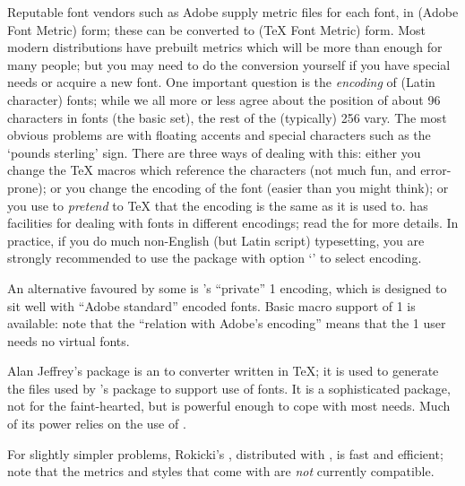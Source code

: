 Reputable font vendors such as Adobe supply metric files for each
font, in  (Adobe Font Metric) form; these can be converted
to  (\TeX{} Font Metric) form. Most modern distributions have
prebuilt metrics which will be more than enough for many people; but you may
need to do the conversion yourself if you have special needs or
acquire a new font. One important question is the \emph{encoding} of
(Latin character) fonts; while we all more or less agree about the
position of about 96 characters in fonts (the basic  set), the
rest of the (typically) 256 vary. The most obvious problems are with
floating accents and special characters such as the `pounds sterling'
sign. There are three ways of dealing with this: either you change the
\TeX{} macros which reference the characters (not much fun, and
error-prone); or you change the encoding of the font (easier than you
might think); or you use  to
\emph{pretend} to \TeX{} that the encoding is the same as it is used to.
\LaTeXe{} has facilities for dealing with fonts in different
encodings; read the  for
more details.  In practice, if you do much non-English (but Latin
script) typesetting, you are strongly recommended to use the
 package with option `' to select
 encoding.

An alternative favoured by some is \YandY{}'s ``private'' 1 encoding,
which is designed to sit well with ``Adobe standard'' encoded fonts.
Basic macro support of 1 is available: note that the
``relation with Adobe's encoding'' means that the 1 user
needs no virtual fonts.

Alan Jeffrey's  package is an  to
 converter written in \TeX{}; it is used to generate the
files used by \LaTeXe{}'s  package to support use of
\PS{} fonts. It is a sophisticated package, not for the faint-hearted,
but is powerful enough to cope with most needs.  Much of its power
relies on the use of .

For slightly simpler problems, Rokicki's ,
distributed with , is fast and
efficient; note that the metrics and styles that come with
 are \emph{not} currently \LaTeXe{} compatible.

